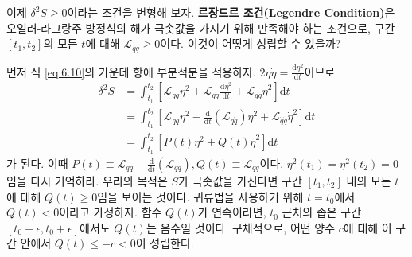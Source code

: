 \documentclass[chapter, oneside, b5paper]{oblivoir}
\theoremstyle{plain}
\theoremstyle{definition}
\theoremstyle{remark}
\begin{document}
이제 $\delta ^2 S \geq 0$이라는 조건을 변형해 보자. \textbf{르장드르 조건(Legendre Condition)}은 오일러-라그랑주 방정식의 해가 극솟값을 가지기 위해 만족해야 하는 조건으로, 구간 $[t_1, t_2]$의 모든 $t$에 대해 $\mathcal{L}_{\dot{q}\dot{q}} \geq 0$이다. 이것이 어떻게 성립할 수 있을까?

먼저 식 \ref{eq:6.10}의 가운데 항에 부분적분을 적용하자. $2\eta \dot{\eta} = \frac{\mathrm{d}\eta^2}{\mathrm{d}t}$이므로
\begin{equation}
    \begin{aligned}
        \delta^2 S &= \int_{t_1}^{t_2} \left[\mathcal{L}_{qq} \eta^2 + \mathcal{L}_{q\dot{q}} \frac{\mathrm{d}\eta^2}{\mathrm{d}t} + \mathcal{L}_{\dot{q}\dot{q}}\dot{\eta}^
    2 \right] \mathrm{d}t \\
    &= \int_{t_1}^{t_2} \left[\mathcal{L}_{qq} \eta^2 - \frac{\mathrm{d}}{\mathrm{d}t} \left(\mathcal{L}_{q\dot{q}} \right) \eta^2 + \mathcal{L}_{\dot{q}\dot{q}}\dot{\eta}^
    2 \right] \mathrm{d}t \\
    &= \int_{t_1}^{t_2} [P(t) \eta^2 + Q(t) \dot{\eta}^2] \mathrm{d}t
    \end{aligned}
    \label{eq:6.12}
\end{equation}
가 된다. 이때 $P(t) \equiv \mathcal{L}_{qq} - \frac{\mathrm{d}}{\mathrm{d}t} \left(\mathcal{L}_{q\dot{q}} \right), Q(t) \equiv \mathcal{L}_{\dot{q}\dot{q}}$이다. $\eta^2(t_1)=\eta^2(t_2)=0$임을 다시 기억하라. 우리의 목적은 $S$가 극솟값을 가진다면 구간 $[t_1, t_2]$ 내의 모든 $t$에 대해 $Q(t) \geq 0$임을 보이는 것이다. 귀류법을 사용하기 위해 $t=t_0$에서 $Q(t) < 0$이라고 가정하자. 함수 $Q(t)$가 연속이라면, $t_0$ 근처의 좁은 구간 $[t_0 - \epsilon, t_0 + \epsilon]$에서도 $Q(t)$는 음수일 것이다. 구체적으로, 어떤 양수 $c$에 대해 이 구간 안에서 $Q(t) \leq -c < 0$이 성립한다.
\end{document}
